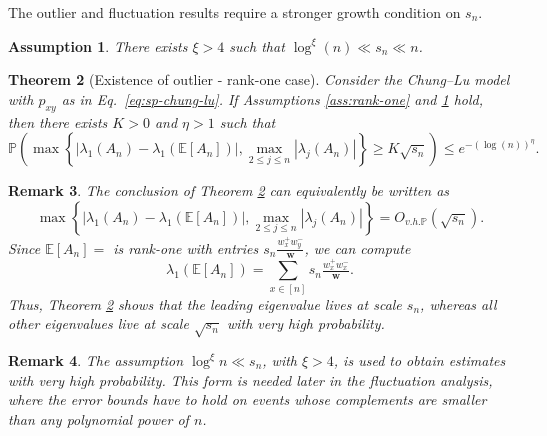 \documentclass[11pt,oneside]{amsart}
\theoremstyle{plain}
\newtheorem{theorem}{Theorem}[section]
\newtheorem{assumption}[theorem]{Assumption}
\newtheorem{remark}[theorem]{Remark}
\numberwithin{equation}{section}
\newcommand{\E}{\mathbb{E}}
\newcommand{\p}{\mathbb{P}}
\newcommand{\w}{\boldsymbol{w}}
\newcommand{\scaling}{s_n}
\newcommand{\Ohp}{O_{v.h.\p}}
\begin{document}
The outlier and fluctuation results require a stronger growth condition on $\scaling$.
\begin{assumption}\label{assumption:xi} 
There exists $\xi>4$ such that $ \log^\xi(n)\ll \scaling \ll n$.
\end{assumption}
\begin{theorem}[Existence of outlier - rank-one case] \label{thm:LLN-A}
Consider the Chung--Lu model with $p_{xy}$ as in Eq.\ \eqref{eq:sp-chung-lu}.
If Assumptions \ref{ass:rank-one} and \ref{assumption:xi} hold, then there exists $K>0$ and $\eta>1$ such that
\begin{equation}
    \p\left(\max\left\{\left|\lambda_1(A_n)- \lambda_1(\E[A_n]) \right|,\max_{ 2 \le j\le n}|\lambda_j(A_n)|\right\}\ge K\sqrt{\scaling} \right)\le e^{-(\log(n))^{\eta}}.
\end{equation}
\end{theorem}
\begin{remark}The conclusion of Theorem \ref{thm:LLN-A} can equivalently be written as
\begin{equation}
\label{eq:LLN-A-Ohp}
\max\left\{
|\lambda_1(A_n)-\lambda_1(\E[A_n])|,
\max_{2\le j\le n}|\lambda_j(A_n)|
\right\}
=
\Ohp(\sqrt{\scaling}).
\end{equation}
    Since $\E[A_n]=$ is rank-one with entries $\scaling \tfrac{w_x^+w_y^-}{\w}$, we can compute $$\lambda_1(\E[A_n])=\sum_{x\in [n]} \scaling \tfrac{w_x^+w_x^-}{\w}.$$
 Thus, Theorem \ref{thm:LLN-A} shows that the leading eigenvalue lives at scale $\scaling$, whereas all other eigenvalues live at scale $\sqrt{\scaling}$ with very high probability.
\end{remark}
\begin{remark}
The assumption $\log^\xi n\ll \scaling$, with $\xi>4$, is used to obtain estimates with very high probability. This form is needed later in the fluctuation analysis, where the error bounds have to hold on events whose complements are smaller than any polynomial power of $n$. 
\end{remark}
\end{document}
